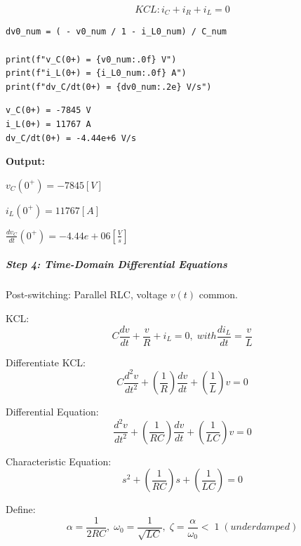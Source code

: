 \begin{equation}
KCL: i_C + i_R + i_L = 0
\end{equation}

\begin{verbatim}
dv0_num = ( - v0_num / 1 - i_L0_num) / C_num

print(f"v_C(0+) = {v0_num:.0f} V")
print(f"i_L(0+) = {i_L0_num:.0f} A")
print(f"dv_C/dt(0+) = {dv0_num:.2e} V/s")
\end{verbatim}

\begin{verbatim}
v_C(0+) = -7845 V
i_L(0+) = 11767 A
dv_C/dt(0+) = -4.44e+6 V/s
\end{verbatim}

\textbf{Output:} \newline

$v_{C}(0^+) = -7845 \left[V\right]$ \newline

$i_{L}(0^+) = 11767 \left[A\right]$ \newline

$\frac{dv_C}{dt}(0^+) = -4.44e+06 \left[\frac{V}{s}\right]$

\subparagraph{Step 4: Time-Domain Differential Equations}

Post-switching: Parallel RLC, voltage $v(t)$ common.

KCL:
\begin{equation}
C \frac{dv}{dt} + \frac{v}{R} + i_L = 0, \; with \frac{di_L}{dt} = \frac{v}{L}
\end{equation}

Differentiate KCL:
\begin{equation}
C \frac{d^2v}{dt^2} + \left(\frac{1}{R}\right) \frac{dv}{dt} + \left(\frac{1}{L}\right) v = 0
\end{equation}

Differential Equation:
\begin{equation}
\frac{d^2v}{dt^2} + \left(\frac{1}{R C}\right) \frac{dv}{dt} + \left(\frac{1}{L C}\right) v = 0
\end{equation}

Characteristic Equation:
\begin{equation}
s^2 + \left(\frac{1}{R C}\right) s + \left(\frac{1}{L C}\right) = 0
\end{equation}

Define:
\begin{equation}
\alpha = \frac{1}{2 R C}, \; \omega_0 = \frac{1}{\sqrt{L C}},\; \zeta = \frac{\alpha}{\omega_0} <\;1 \;(underdamped)
\end{equation}

